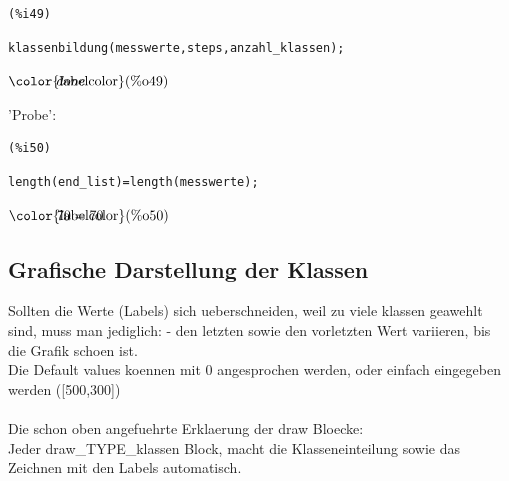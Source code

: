 \documentclass[12pt]{article}
\begin{document}
\noindent
\begin{minipage}[t]{8ex}{\color{red}\bf
\begin{verbatim}
(%i49) 
\end{verbatim}}
\end{minipage}
\begin{minipage}[t]{\textwidth}{\color{blue}
\begin{verbatim}
klassenbildung(messwerte,steps,anzahl_klassen);
\end{verbatim}}
\end{minipage}
\begin{math}\displaystyle
\parbox{8ex}{\color{labelcolor}(\%o49) }
done
\end{math}

'Probe':

\noindent
\begin{minipage}[t]{8ex}{\color{red}\bf
\begin{verbatim}
(%i50) 
\end{verbatim}}
\end{minipage}
\begin{minipage}[t]{\textwidth}{\color{blue}
\begin{verbatim}
length(end_list)=length(messwerte);
\end{verbatim}}
\end{minipage}
\begin{math}\displaystyle
\parbox{8ex}{\color{labelcolor}(\%o50) }
70=70
\end{math}


\subsection{Grafische Darstellung der Klassen}


Sollten die Werte (Labels) sich ueberschneiden, weil zu viele klassen geawehlt sind, muss man jediglich:
- den letzten sowie den vorletzten Wert variieren, bis die Grafik schoen ist. \\
Die Default values koennen mit 0 angesprochen werden, oder einfach eingegeben werden ([500,300])
\\ \\
Die schon oben angefuehrte Erklaerung der draw Bloecke: \\
    Jeder draw\_TYPE\_klassen Block, macht die Klasseneinteilung sowie das Zeichnen mit den Labels automatisch. \\ \\
\end{document}
